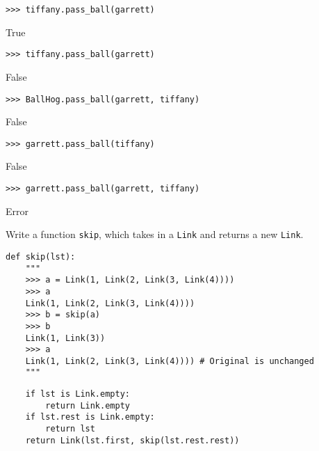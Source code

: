 \documentclass{exam}
\begin{document}
\begin{questions}
\begin{blocksection}
\begin{lstlisting}
>>> tiffany.pass_ball(garrett)
\end{lstlisting}
\begin{solution}[.2in]
True
\end{solution}

\begin{lstlisting}
>>> tiffany.pass_ball(garrett)
\end{lstlisting}
\begin{solution}[.2in]
False
\end{solution}

\begin{lstlisting}
>>> BallHog.pass_ball(garrett, tiffany)
\end{lstlisting}
\begin{solution}[.2in]
False
\end{solution}

\begin{lstlisting}
>>> garrett.pass_ball(tiffany)
\end{lstlisting}
\begin{solution}[.2in]
False
\end{solution}

\begin{lstlisting}
>>> garrett.pass_ball(garrett, tiffany)
\end{lstlisting}
\begin{solution}[.2in]
Error
\end{solution}
\end{blocksection}

\begin{blocksection}
\question Write a function \texttt{skip}, which takes in a \texttt{Link} and returns a new \texttt{Link}.

\begin{lstlisting}
def skip(lst):
    """
    >>> a = Link(1, Link(2, Link(3, Link(4))))
    >>> a
    Link(1, Link(2, Link(3, Link(4))))
    >>> b = skip(a)
    >>> b
    Link(1, Link(3))
    >>> a
    Link(1, Link(2, Link(3, Link(4)))) # Original is unchanged
    """
\end{lstlisting}
\begin{solution}[1in]
\begin{lstlisting}
    if lst is Link.empty:
        return Link.empty
    if lst.rest is Link.empty:
        return lst
    return Link(lst.first, skip(lst.rest.rest))
\end{lstlisting}
\end{solution}
\end{blocksection}


\end{questions}
\end{document}
